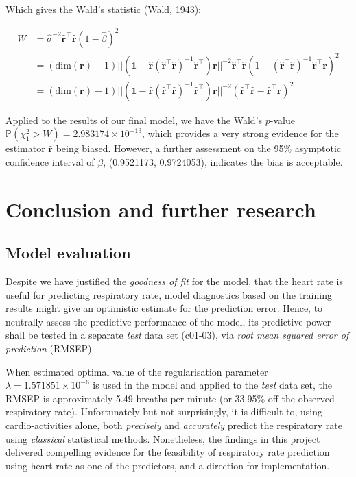\documentclass[
]{article}
\begin{document}
Which gives the Wald's statistic (Wald, 1943):

\begin{align*}
  W &= \hat{\sigma}^{-2}\mathbf{\hat{r}}^\top\mathbf{\hat{r}}(1 - \hat{\beta})^2 \\
  &= (\text{dim}(\mathbf{r}) - 1) ||(\mathbf{1} - \mathbf{\hat{r}}(\mathbf{\hat{r}}^\top\mathbf{\hat{r}})^{-1}\mathbf{\hat{r}}^\top)\mathbf{r}||^{-2}\mathbf{\hat{r}}^\top\mathbf{\hat{r}}(1 - (\mathbf{\hat{r}}^\top\mathbf{\hat{r}})^{-1}\mathbf{\hat{r}}^\top\mathbf{r})^2 \\
  &= (\text{dim}(\mathbf{r}) - 1) ||(\mathbf{1} - \mathbf{\hat{r}}(\mathbf{\hat{r}}^\top\mathbf{\hat{r}})^{-1}\mathbf{\hat{r}}^\top)\mathbf{r}||^{-2}(\mathbf{\hat{r}}^\top\mathbf{\hat{r}} - \mathbf{\hat{r}}^\top\mathbf{r})^2
\end{align*}

Applied to the results of our final model, we have the Wald's
\(p\)-value \(\mathbb{P}(\chi_1^2 > W) = 2.983174 \times 10^{-13}\),
which provides a very strong evidence for the estimator
\(\mathbf{\hat{r}}\) being biased. However, a further assessment on the
95\% asymptotic confidence interval of \(\beta\), (0.9521173,
0.9724053), indicates the bias is acceptable.

\newpage

\hypertarget{conclusion-and-further-research}{%
\section{Conclusion and further
research}\label{conclusion-and-further-research}}

\hypertarget{model-evaluation}{%
\subsection{Model evaluation}\label{model-evaluation}}

Despite we have justified the \emph{goodness of fit} for the model, that
the heart rate is useful for predicting respiratory rate, model
diagnostics based on the training results might give an optimistic
estimate for the prediction error. Hence, to neutrally assess the
predictive performance of the model, its predictive power shall be
tested in a separate \emph{test} data set (c01-03), via \emph{root mean
squared error of prediction} (RMSEP).

When estimated optimal value of the regularisation parameter
\(\lambda = 1.571851 \times 10^{-6}\) is used in the model and applied
to the \emph{test} data set, the RMSEP is approximately 5.49 breaths per
minute (or 33.95\% off the observed respiratory rate). Unfortunately but
not surprisingly, it is difficult to, using cardio-activities alone,
both \emph{precisely} and \emph{accurately} predict the respiratory rate
using \emph{classical} statistical methods. Nonetheless, the findings in
this project delivered compelling evidence for the feasibility of
respiratory rate prediction using heart rate as one of the predictors,
and a direction for implementation.
\end{document}
